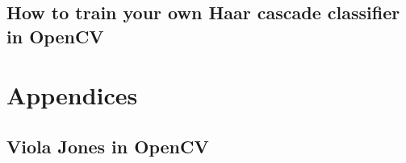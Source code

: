 \documentclass[a4paper]{article}
\begin{document}
\subsection{How to train your own Haar cascade classifier in OpenCV}

\TODO




\newpage
\appendix

\section{Appendices}

\newpage
\subsection{Viola Jones in OpenCV}
\label{app:viola_jones_cv}




\newpage
\printbibliography
\end{document}
